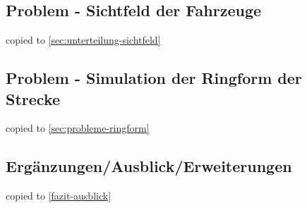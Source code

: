 \subsection{Problem - Sichtfeld der Fahrzeuge}
copied to \cref{sec:unterteilung-sichtfeld}


\subsection{Problem - Simulation der Ringform der Strecke}
copied to \cref{sec:probleme-ringform}




\subsection{Ergänzungen/Ausblick/Erweiterungen}
copied to \cref{fazit-ausblick}
